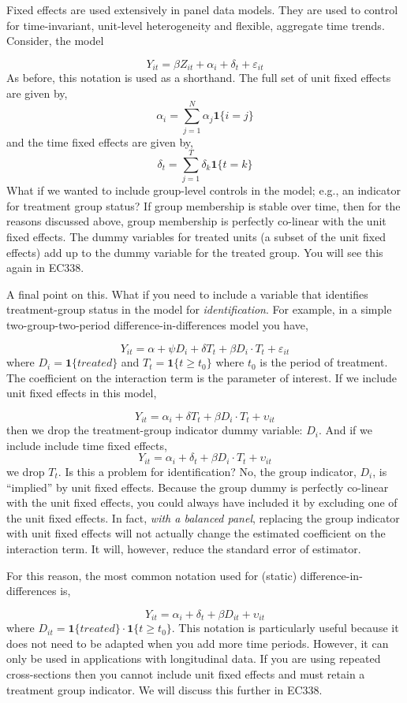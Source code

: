 \documentclass[
  letterpaper,
  DIV=11,
  numbers=noendperiod]{scrreprt}
\begin{document}
Fixed effects are used extensively in panel data models. They are used
to control for time-invariant, unit-level heterogeneity and flexible,
aggregate time trends. Consider, the model

\[
  Y_{it} = \beta Z_{it} + \alpha_i + \delta_t + \varepsilon_{it}
\] As before, this notation is used as a shorthand. The full set of unit
fixed effects are given by, \[
\alpha_i=\sum_{j=1}^N\alpha_j\mathbf{1}\{i=j\}
\] and the time fixed effects are given by, \[
\delta_t=\sum_{j=1}^T\delta_k\mathbf{1}\{t=k\}
\] What if we wanted to include group-level controls in the model; e.g.,
an indicator for treatment group status? If group membership is stable
over time, then for the reasons discussed above, group membership is
perfectly co-linear with the unit fixed effects. The dummy variables for
treated units (a subset of the unit fixed effects) add up to the dummy
variable for the treated group. You will see this again in EC338.

A final point on this. What if you need to include a variable that
identifies treatment-group status in the model for
\emph{identification}. For example, in a simple two-group-two-period
difference-in-differences model you have,

\[
  Y_{it} = \alpha + \psi D_i + \delta T_t + \beta D_i\cdot T_t + \varepsilon_{it}
\] where \(D_i = \mathbf{1}\{treated\}\) and
\(T_t = \mathbf{1}\{t\geq t_0\}\) where \(t_0\) is the period of
treatment. The coefficient on the interaction term is the parameter of
interest. If we include unit fixed effects in this model,

\[
  Y_{it} = \alpha_i + \delta T_t + \beta D_i\cdot T_t + \upsilon_{it}
\] then we drop the treatment-group indicator dummy variable: \(D_i\).
And if we include include time fixed effects, \[
  Y_{it} = \alpha_i + \delta_t + \beta D_i\cdot T_t + \upsilon_{it}
\] we drop \(T_t\). Is this a problem for identification? No, the group
indicator, \(D_i\), is ``implied'' by unit fixed effects. Because the
group dummy is perfectly co-linear with the unit fixed effects, you
could always have included it by excluding one of the unit fixed
effects. In fact, \emph{with a balanced panel}, replacing the group
indicator with unit fixed effects will not actually change the estimated
coefficient on the interaction term. It will, however, reduce the
standard error of estimator.

For this reason, the most common notation used for (static)
difference-in-differences is,

\[
  Y_{it} = \alpha_i + \delta_t + \beta D_{it} + \upsilon_{it}
\] where \(D_{it} = \mathbf{1}\{treated\}\cdot\mathbf{1}\{t\geq t_0\}\).
This notation is particularly useful because it does not need to be
adapted when you add more time periods. However, it can only be used in
applications with longitudinal data. If you are using repeated
cross-sections then you cannot include unit fixed effects and must
retain a treatment group indicator. We will discuss this further in
EC338.
\end{document}
